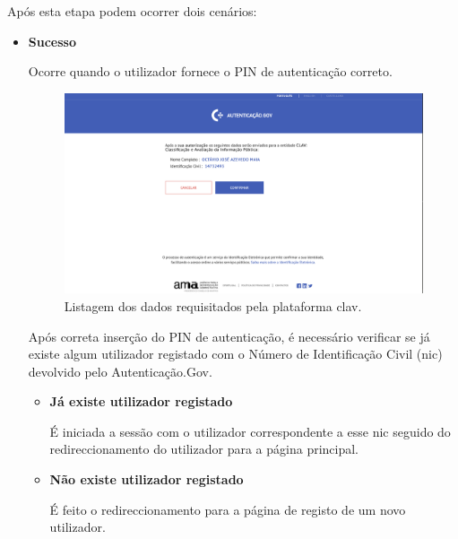 Após esta etapa podem ocorrer dois cenários:

\begin{itemize}
    \item \textbf{Sucesso}
    
    Ocorre quando o utilizador fornece o PIN de autenticação correto.
    
    \begin{figure}[H]
        \centering
        \includegraphics[width=\textwidth]{img/clav/authCC/authgov3.png}
        \caption{Listagem dos dados requisitados pela plataforma \gls{clav}.}
        \label{fig:listagemDadosCLAV}
    \end{figure}
    
    Após correta inserção do PIN de autenticação, é necessário verificar se já existe algum utilizador registado com o Número de Identificação Civil (\gls{nic}) devolvido pelo Autenticação.Gov.
    
    \begin{itemize}
        \item \textbf{Já existe utilizador registado}
        
        É iniciada a sessão com o utilizador correspondente a esse \gls{nic} seguido do redireccionamento do utilizador para a página principal.
            
        \vspace{10mm}
        \item \textbf{Não existe utilizador registado}
        
        É feito o redireccionamento para a página de registo de um novo utilizador.
        

\end{itemize}
\end{itemize}
